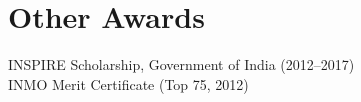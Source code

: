 \documentclass[11pt]{article}
\begin{document}
	
	\section*{Other Awards}
	INSPIRE Scholarship, Government of India (2012--2017) \\
	INMO Merit Certificate (Top 75, 2012)
	
\end{document}
